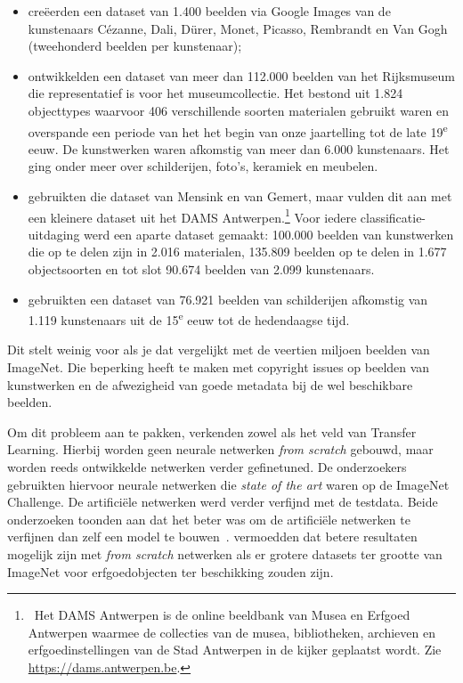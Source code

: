 \begin{itemize}
	\item \textcite{Blessings2013} cre\"{e}erden een dataset van 1.400 beelden via Google Images van de kunstenaars C\'{e}zanne, Dali, D\"{u}rer, Monet, Picasso, Rembrandt en Van Gogh (tweehonderd beelden per kunstenaar);
	\item \textcite{Mensink2014} ontwikkelden een dataset van meer dan 112.000 beelden van het Rijksmuseum die representatief is voor het museumcollectie. Het bestond uit 1.824 objecttypes waarvoor 406 verschillende soorten materialen gebruikt waren en overspande een periode van het het begin van onze jaartelling tot de late 19\textsuperscript{e} eeuw. De kunstwerken waren afkomstig van meer dan 6.000 kunstenaars. Het ging onder meer over schilderijen, foto’s, keramiek en meubelen.
	\item \textcite{Sabatteli2018} gebruikten die dataset van Mensink en van Gemert, maar vulden dit aan met een kleinere dataset uit het DAMS Antwerpen.\footnote{~Het DAMS Antwerpen is de online beeldbank van Musea en Erfgoed Antwerpen waarmee de collecties van de musea, bibliotheken, archieven en erfgoedinstellingen van de Stad Antwerpen in de kijker geplaatst wordt. Zie \url{https://dams.antwerpen.be}.} Voor iedere classificatie-uitdaging werd een aparte dataset gemaakt: 100.000 beelden van kunstwerken die op te delen zijn in 2.016 materialen, 135.809 beelden op te delen  in 1.677 objectsoorten en tot slot 90.674 beelden van 2.099 kunstenaars.
	\item \textcite{Elgammal2018} gebruikten een dataset van 76.921 beelden van schilderijen afkomstig van 1.119 kunstenaars uit de 15\textsuperscript{e} eeuw tot de hedendaagse tijd.
\end{itemize}

Dit stelt weinig voor als je dat vergelijkt met de veertien miljoen beelden van ImageNet. Die beperking heeft te maken met copyright issues op beelden van kunstwerken en de afwezigheid van goede metadata bij de wel beschikbare beelden. 

Om dit probleem aan te pakken, verkenden zowel \textcite{Sabatteli2018} als \textcite{Elgammal2018} het veld van Transfer Learning. Hierbij worden geen neurale netwerken \textit{from scratch} gebouwd, maar worden reeds ontwikkelde netwerken verder gefinetuned. De onderzoekers gebruikten hiervoor neurale netwerken die \textit{state of the art} waren op de ImageNet Challenge. De artifici\"{e}le netwerken werd verder verfijnd met de testdata. Beide onderzoeken toonden aan dat het beter was om de artificiële netwerken te verfijnen dan zelf een model te bouwen~\autocite{Sabatteli2018}. \textcite{Elgammal2018} vermoedden dat betere resultaten mogelijk zijn met \textit{from scratch} netwerken als er grotere datasets ter grootte van ImageNet voor erfgoedobjecten ter beschikking zouden zijn.

